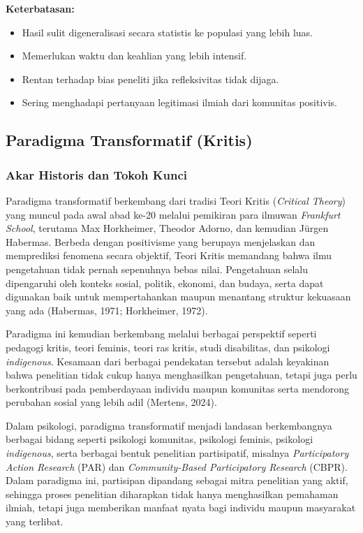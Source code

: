 \documentclass[
  indonesian,
  letterpaper,
  DIV=11,
  numbers=noendperiod]{scrreprt}
\providecommand{\tightlist}{%
  \setlength{\itemsep}{0pt}\setlength{\parskip}{0pt}}
\begin{document}
\textbf{Keterbatasan:}

\begin{itemize}
\tightlist
\item
  Hasil sulit digeneralisasi secara statistis ke populasi yang lebih
  luas.
\item
  Memerlukan waktu dan keahlian yang lebih intensif.
\item
  Rentan terhadap bias peneliti jika refleksivitas tidak dijaga.
\item
  Sering menghadapi pertanyaan legitimasi ilmiah dari komunitas
  positivis.
\end{itemize}

\subsection{Paradigma Transformatif
(Kritis)}\label{paradigma-transformatif-kritis}

\subsubsection{Akar Historis dan Tokoh
Kunci}\label{akar-historis-dan-tokoh-kunci-3}

Paradigma transformatif berkembang dari tradisi Teori Kritis
(\emph{Critical Theory}) yang muncul pada awal abad ke-20 melalui
pemikiran para ilmuwan \emph{Frankfurt School}, terutama Max Horkheimer,
Theodor Adorno, dan kemudian Jürgen Habermas. Berbeda dengan positivisme
yang berupaya menjelaskan dan memprediksi fenomena secara objektif,
Teori Kritis memandang bahwa ilmu pengetahuan tidak pernah sepenuhnya
bebas nilai. Pengetahuan selalu dipengaruhi oleh konteks sosial,
politik, ekonomi, dan budaya, serta dapat digunakan baik untuk
mempertahankan maupun menantang struktur kekuasaan yang ada (Habermas,
1971; Horkheimer, 1972).

Paradigma ini kemudian berkembang melalui berbagai perspektif seperti
pedagogi kritis, teori feminis, teori ras kritis, studi disabilitas, dan
psikologi \emph{indigenous}. Kesamaan dari berbagai pendekatan tersebut
adalah keyakinan bahwa penelitian tidak cukup hanya menghasilkan
pengetahuan, tetapi juga perlu berkontribusi pada pemberdayaan individu
maupun komunitas serta mendorong perubahan sosial yang lebih adil
(Mertens, 2024).

Dalam psikologi, paradigma transformatif menjadi landasan berkembangnya
berbagai bidang seperti psikologi komunitas, psikologi feminis,
psikologi \emph{indigenous}, serta berbagai bentuk penelitian
partisipatif, misalnya \emph{Participatory Action Research} (PAR) dan
\emph{Community-Based Participatory Research} (CBPR). Dalam paradigma
ini, partisipan dipandang sebagai mitra penelitian yang aktif, sehingga
proses penelitian diharapkan tidak hanya menghasilkan pemahaman ilmiah,
tetapi juga memberikan manfaat nyata bagi individu maupun masyarakat
yang terlibat.
\end{document}
